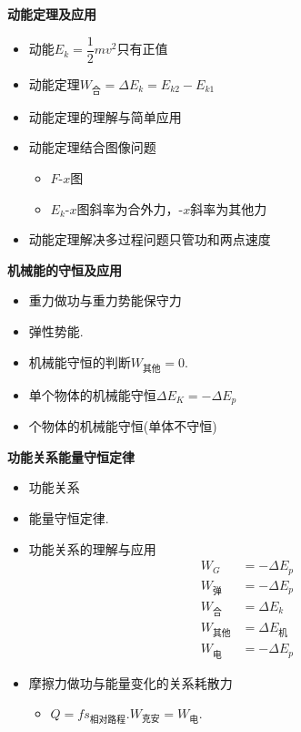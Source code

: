 \textbf{动能定理及应用}
\begin{itemize}
\item 动能\quad $E_k=\dfrac{1}{2}mv^2$\quad 只有正值
\item 动能定理\quad $W_{\text{合}}=\Delta E_k=E_{k2}-E_{k1}$
\item 动能定理的理解与简单应用
\item 动能定理结合图像问题
  \begin{itemize}
  \item $F$-$x$图 %
  \item $E_k$-$x$图斜率为合外力，$\text{-}x$斜率为其他力 %
  \end{itemize}
\item 动能定理解决多过程问题\quad 只管功和两点速度
\end{itemize}
\textbf{机械能的守恒及应用}
\begin{itemize}
\item 重力做功与重力势能\quad 保守力
\item 弹性势能.
\item 机械能守恒的判断\quad $W_{\text{其他}}=0$.
\item 单个物体的机械能守恒\quad $\Delta E_K=-\Delta E_p$
\item {}个物体的机械能守恒\quad (单体不守恒) %
\end{itemize}
\textbf{功能关系\quad 能量守恒定律}
\begin{itemize}
\item 功能关系
\item 能量守恒定律.
\end{itemize}
\begin{itemize}
\item 功能关系的理解与应用
  \begin{align*}
  W_{G}&=-\Delta E_p \\ %
  W_{\text{弹}}&=-\Delta E_p \\
  W_{\text{合}}&=\Delta E_k \\
  W_{\text{其他}}&=\Delta E_{\text{机}} \\
  W_{\text{电}}&=-\Delta E_p
  \end{align*}
\item 摩擦力做功与能量变化的关系\quad 耗散力
  \begin{itemize}
  \item $Q=fs_{\text{相对路程}}$.\quad $W_{\text{克安}}=W_{\text{电}}$.
  \end{itemize}
\end{itemize}
